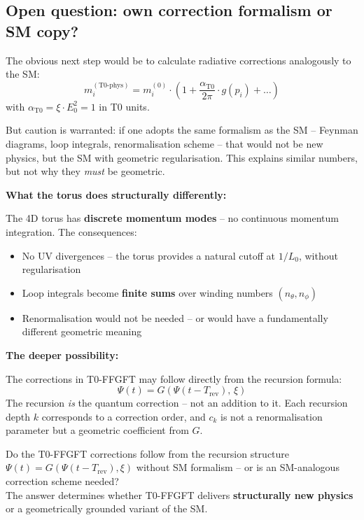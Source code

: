 \subsection{Open question: own correction formalism or SM copy?}

The obvious next step would be to calculate radiative corrections
analogously to the SM:
\begin{equation}
    m_i^{(\text{T0-phys})} = m_i^{(0)} \cdot
    \left(1 + \frac{\alpha_{\text{T0}}}{2\pi} \cdot g(p_i) + \ldots\right)
\end{equation}
with $\alpha_{\text{T0}} = \xi \cdot E_0^2 = 1$ in T0 units.

But caution is warranted: if one adopts the same formalism as the SM
-- Feynman diagrams, loop integrals, renormalisation scheme -- that
would not be new physics, but the SM with geometric regularisation.
This explains similar numbers, but not why they \emph{must} be geometric.

\textbf{What the torus does structurally differently:}

The 4D torus has \textbf{discrete momentum modes} -- no continuous
momentum integration. The consequences:
\begin{itemize}
    \item No UV divergences -- the torus provides a natural cutoff
          at $1/L_0$, without regularisation
    \item Loop integrals become \textbf{finite sums} over winding
          numbers $(n_\theta, n_\phi)$
    \item Renormalisation would not be needed -- or would have a
          fundamentally different geometric meaning
\end{itemize}

\textbf{The deeper possibility:}

The corrections in T0-FFGFT may follow directly from the recursion
formula:
\begin{equation}
    \Psi(t) = G\!\left(\Psi(t - T_{\text{rev}}),\, \xi\right)
\end{equation}
The recursion \emph{is} the quantum correction -- not an addition to it.
Each recursion depth $k$ corresponds to a correction order, and $c_k$
is not a renormalisation parameter but a geometric coefficient from $G$.

\begin{predbox}
Do the T0-FFGFT corrections follow from the recursion structure
$\Psi(t) = G(\Psi(t-T_{\text{rev}}), \xi)$ without SM formalism --
or is an SM-analogous correction scheme needed?\\[4pt]
The answer determines whether T0-FFGFT delivers \textbf{structurally
new physics} or a geometrically grounded variant of the SM.
\end{predbox}

